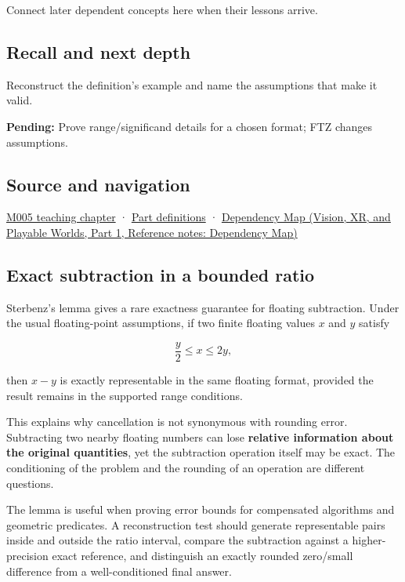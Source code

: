 \hypertarget{appendix-399b7ad53f39-used-by}{}

Connect later dependent concepts here when their lessons arrive.

\subsection{Recall and next depth}\label{appendix-399b7ad53f39-recall-and-next-depth}

\hypertarget{appendix-399b7ad53f39-recall-and-next-depth}{}

Reconstruct the definition's example and name the assumptions that make it valid.

\textbf{Pending:} Prove range/significand details for a chosen format; FTZ changes assumptions.

\subsection{Source and navigation}\label{appendix-399b7ad53f39-source-and-navigation}

\hypertarget{appendix-399b7ad53f39-source-and-navigation}{}

\hyperref[01-foundations-i-ch001-when-arithmetic-meets-uncertainty]{M005 teaching chapter} · \hyperref[appendix-fd090d982a15-m005---parts-77-88]{Part definitions} · \href{../07-Vision-XR-and-Playable-Worlds-P01/main.pdf\#nameddest=appendix-4ad47bdd269a}{Dependency Map (Vision, XR, and Playable Worlds, Part 1, Reference notes: Dependency Map)}

\subsection{Exact subtraction in a bounded ratio}\label{appendix-399b7ad53f39-exact-subtraction-in-a-bounded-ratio}

\hypertarget{appendix-399b7ad53f39-exact-subtraction-in-a-bounded-ratio}{}

Sterbenz's lemma gives a rare exactness guarantee for floating subtraction. Under the usual floating-point assumptions, if two finite floating values \(x\) and \(y\) satisfy

\[
\frac{y}{2} \le x \le 2y,
\]

then \(x-y\) is exactly representable in the same floating format, provided the result remains in the supported range conditions.

This explains why cancellation is not synonymous with rounding error. Subtracting two nearby floating numbers can lose \textbf{relative information about the original quantities}, yet the subtraction operation itself may be exact. The conditioning of the problem and the rounding of an operation are different questions.

The lemma is useful when proving error bounds for compensated algorithms and geometric predicates. A reconstruction test should generate representable pairs inside and outside the ratio interval, compare the subtraction against a higher-precision exact reference, and distinguish an exactly rounded zero/small difference from a well-conditioned final answer.
